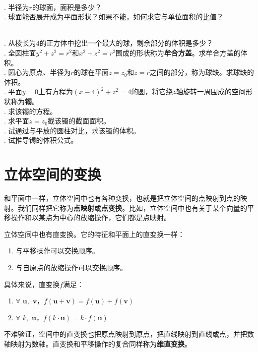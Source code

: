 \documentclass[12pt,UTF8,fontset=none]{ctexbook}
\begin{document}
\begin{sk}
    \mbox{}\\
    . 半径为$r$的球面，面积是多少？\\
    . 球面能否展开成为平面形状？如果不能，如何求它与单位面积的比值？
\end{sk}

\begin{xt}
    \mbox{}\\
    . 从棱长为$4$的正方体中挖出一个最大的球，剩余部分的体积是多少？\\
    . 全圆柱面$y^2+z^2=r^2$和$x^2+z^2=r^2$围成的形状称为\textbf{牟合方盖}。求牟合方盖的体积。\\
    . 圆心为原点、半径为$r$的球在平面$z = z_0$和$z = r$之间的部分，称为球缺。求球缺的体积。 \\
    . 平面$y = 0$上有方程为$(x - 4)^2 + z^2 = 4$的圆，将它绕$z$轴旋转一周围成的空间形状称为\textbf{镯}。\\
    . 求该镯的方程。\\
    . 求平面$z = z_0$截该镯的截面面积。\\ 
    . 试通过与平放的圆柱对比，求该镯的体积。\\
    . 试推导镯的体积公式。
\end{xt}

\chapter{立体空间的变换}

和平面中一样，立体空间中也有各种变换，也就是把立体空间的点映射到点的映射。我们同样把它称为\textbf{点映射}或\textbf{点变换}。比如，立体空间中也有关于某个向量的平移操作和以某点为中心的放缩操作，它们都是点映射。

立体空间中也有直变换。它的特征和平面上的直变换一样：
\begin{enumerate}
    \item 与平移操作可以交换顺序。
    \item 与自原点的放缩操作可以交换顺序。
\end{enumerate}
具体来说，直变换$f$满足：
\begin{enumerate}
    \item $\forall \,\,\mathbf{u}, \,\,\mathbf{v}$，$f(\mathbf{u} + \mathbf{v}) = f(\mathbf{u}) + f(\mathbf{v})$
    \item $\forall \,\,k, \,\, \mathbf{u}$，$f(k\cdot \mathbf{u}) = k \cdot f(\mathbf{u})$
\end{enumerate}
不难验证，空间中的直变换也把原点映射到原点，把直线映射到直线或点，并把数轴映射为数轴。直变换和平移操作的复合同样称为\textbf{维直变换}。
\end{document}
